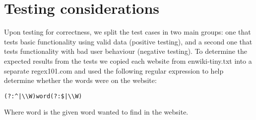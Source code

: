 \section{Testing considerations} %
Upon testing for correctness, we split the test cases in two main groups: one that tests basic functionality using valid data (positive testing), and a second one that tests functionality with bad user behaviour (negative testing).
To determine the expected results from the tests we copied each website from enwiki-tiny.txt into a separate regex101.com and used the following regular expression to help determine whether the words were on the website:\\
\begin{lstlisting}
(?:^|\\W)word(?:$|\\W)
\end{lstlisting}
Where word is the given word wanted to find in the website.
